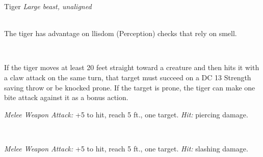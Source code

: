 \documentclass[10pt,twoside,twocolumn,openany]{book}
\begin{document}
\begin{monsterboxnobg}{Tiger}
	\textit{Large beast, unaligned}\\
	\hline
	\basics[
		armorclass	= 12,
		hitpoints		= \dice{5d10 + 10},
		speed		= {40 ft.}
	]
	\hline
	\stats[
		STR	= \stat{17},
		DEX	= \stat{15},
		CON	= \stat{14},
		INT	= \stat{3},
		WIS	= \stat{12},
		CHA	= \stat{8}
	]
	\hline
	\details[
		skills			= {Perception +3, Stealth +6},
		senses		= {darkvision 60 ft., passive Perception 13},
		languages		= {-},
		challenge		= 1
	]
	\hline \\[1mm]
	\begin{monsteraction}
		The tiger has advantage on llisdom (Perception) checks that rely on smell.
	\end{monsteraction}\\
	\begin{monsteraction}[Pounce]
		If the tiger moves at least 20 feet straight toward a creature and then hits it with a claw attack on the same turn, that target must succeed on a DC 13 Strength saving throw or be knocked prone. If the target is prone, the tiger can make one bite attack against it as a bonus action.
	\end{monsteraction}
	\begin{monsteraction}[Bite]
		\textit{Melee Weapon Attack:} +5 to hit, reach 5 ft., one target. \textit{Hit:}  piercing damage.
	\end{monsteraction}\\
	\begin{monsteraction}[Claw]
		\textit{Melee Weapon Attack:} +5 to hit, reach 5 ft., one target. \textit{Hit:}  slashing damage.
	\end{monsteraction}
\end{monsterboxnobg}

\newpage
\printindex
\newpage
\printindex[cr]
\newpage
\printindex[speed]
\newpage
\printindex[foo]
\end{document}
